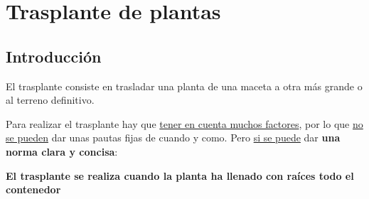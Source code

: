 \documentclass[a4paper,12pt,oneside]{article}
\begin{document}
\section{Trasplante de plantas}
\label{sec:orgaa9e528}
\subsection{Introducción}
\label{sec:org936f6d0}
El trasplante consiste en trasladar una planta de una maceta a otra más grande
o al terreno definitivo.

Para realizar el trasplante hay que \uline{tener en cuenta muchos factores}, por lo
que \uline{no se pueden} dar unas pautas fijas de cuando y como. Pero \uline{si se puede}
dar \textbf{una norma clara y concisa}:
\begin{center}
\textbf{El trasplante se realiza cuando la planta ha llenado con raíces todo el
 contenedor} 
\end{center}
\end{document}
